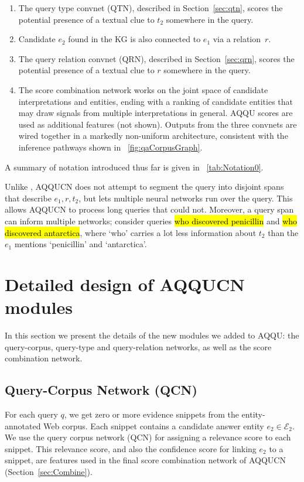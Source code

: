 \documentclass{svjour3}
\DeclareRobustCommand{\query}[1]{{\sethlcolor{qcolor}\sffamily\hl{#1}}}
\begin{document}
\begin{enumerate}
\item The query type convnet (QTN), described in Section~\ref{sec:qtn}, scores the potential presence of a textual clue to $t_2$ somewhere in the query.
\item Candidate $e_2$ found in the KG is also connected to $e_1$ via a relation~$r$.
\item The query relation convnet (QRN), described in Section~\ref{sec:qrn}, scores the potential presence of a textual clue  to $r$ somewhere in the query.
\item The score combination network works on the joint space of candidate interpretations and entities, ending with a ranking of candidate entities that may draw signals from multiple interpretations in general. AQQU scores are used as additional features (not shown).  Outputs from the three convnets are wired together in a markedly non-uniform architecture, consistent with the inference pathways shown in \figurename~\ref{fig:qaCorpusGraph}.  
\end{enumerate}
A summary of notation introduced thus far is given in \tablename~\ref{tab:Notation0}.

Unlike \citet{JoshiSC2014KgCorpusJoint}, AQQUCN does not attempt to segment the query into disjoint spans that describe $e_1, r, t_2$, but lets multiple neural networks run over the query.  This allows AQQUCN to process long queries that \citet{JoshiSC2014KgCorpusJoint} could not.  Moreover, a query span can inform multiple networks; consider queries \query{who discovered penicillin} and \query{who discovered antarctica}, where `who' carries a  lot less information about $t_2$ than the $e_1$ mentions `penicillin' and `antarctica'.



\section{Detailed design of AQQUCN modules}
\label{sec:AqqucnModules}

In this section we present the details of the new modules we added to AQQU:
the query-corpus, query-type and query-relation networks, as well as the score combination network.

\subsection{Query-Corpus Network (QCN)}
\label{sec:qcn}

For each query $q$, we get zero or more evidence snippets from the entity-annotated Web corpus.  Each snippet contains a candidate answer entity $e_2 \in \mathcal{E}_2$.  We use the query corpus network (QCN) for assigning a relevance score to each snippet.   This relevance score, and also the confidence score for linking $e_2$ to a snippet, are features used in the final score combination network of AQQUCN (Section~\ref{sec:Combine}).
\end{document}
